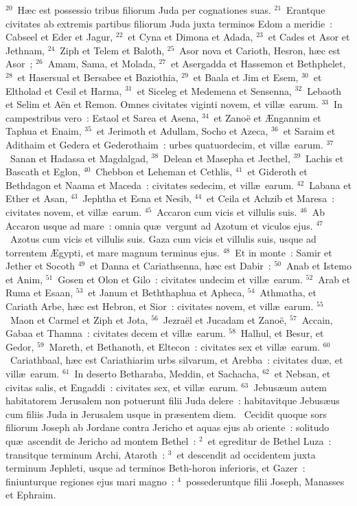 ${}^{20}$~H\ae c est possessio tribus filiorum Juda per cognationes suas.
${}^{21}$~Erantque civitates ab extremis partibus filiorum Juda juxta terminos Edom a meridie~: Cabseel et Eder et Jagur,
${}^{22}$~et Cyna et Dimona et Adada,
${}^{23}$~et Cades et Asor et Jethnam,
${}^{24}$~Ziph et Telem et Baloth,
${}^{25}$~Asor nova et Carioth, Hesron, h\ae c est Asor~;
${}^{26}$~Amam, Sama, et Molada,
${}^{27}$~et Asergadda et Hassemon et Bethphelet,
${}^{28}$~et Hasersual et Bersabee et Baziothia,
${}^{29}$~et Baala et Jim et Esem,
${}^{30}$~et Eltholad et Cesil et Harma,
${}^{31}$~et Siceleg et Medemena et Sensenna,
${}^{32}$~Lebaoth et Selim et A\"en et Remon. Omnes civitates viginti novem, et vill\ae\ earum.
${}^{33}$~In campestribus vero~: Estaol et Sarea et Asena,
${}^{34}$~et Zano\"e et \AE ngannim et Taphua et Enaim,
${}^{35}$~et Jerimoth et Adullam, Socho et Azeca,
${}^{36}$~et Saraim et Adithaim et Gedera et Gederothaim~: urbes quatuordecim, et vill\ae\ earum.
${}^{37}$~Sanan et Hadassa et Magdalgad,
${}^{38}$~Delean et Masepha et Jecthel,
${}^{39}$~Lachis et Bascath et Eglon,
${}^{40}$~Chebbon et Leheman et Cethlis,
${}^{41}$~et Gideroth et Bethdagon et Naama et Maceda~: civitates sedecim, et vill\ae\ earum.
${}^{42}$~Labana et Ether et Asan,
${}^{43}$~Jephtha et Esna et Nesib,
${}^{44}$~et Ceila et Achzib et Maresa~: civitates novem, et vill\ae\ earum.
${}^{45}$~Accaron cum vicis et villulis suis.
${}^{46}$~Ab Accaron usque ad mare~: omnia qu\ae\ vergunt ad Azotum et viculos ejus.
${}^{47}$~Azotus cum vicis et villulis suis. Gaza cum vicis et villulis suis, usque ad torrentem \AE gypti, et mare magnum terminus ejus.
${}^{48}$~Et in monte~: Samir et Jether et Socoth
${}^{49}$~et Danna et Cariathsenna, h\ae c est Dabir~:
${}^{50}$~Anab et Istemo et Anim,
${}^{51}$~Gosen et Olon et Gilo~: civitates undecim et vill\ae\ earum.
${}^{52}$~Arab et Ruma et Esaan,
${}^{53}$~et Janum et Beththaphua et Apheca,
${}^{54}$~Athmatha, et Cariath Arbe, h\ae c est Hebron, et Sior~: civitates novem, et vill\ae\ earum.
${}^{55}$~Maon et Carmel et Ziph et Jota,
${}^{56}$~Jezra\"el et Jucadam et Zano\"e,
${}^{57}$~Accain, Gabaa et Thamna~: civitates decem et vill\ae\ earum.
${}^{58}$~Halhul, et Besur, et Gedor,
${}^{59}$~Mareth, et Bethanoth, et Eltecon~: civitates sex et vill\ae\ earum.
${}^{60}$~Cariathbaal, h\ae c est Cariathiarim urbs silvarum, et Arebba~: civitates du\ae , et vill\ae\ earum.
${}^{61}$~In deserto Betharaba, Meddin, et Sachacha,
${}^{62}$~et Nebsan, et civitas salis, et Engaddi~: civitates sex, et vill\ae\ earum.
${}^{63}$~Jebus\ae um autem habitatorem Jerusalem non potuerunt filii Juda delere~: habitavitque Jebus\ae us cum filiis Juda in Jerusalem usque in pr\ae sentem diem.
~\lettrine[lines=10,image=true,loversize=0.05,lraise=-0.03]{C}{}ecidit quoque sors filiorum Joseph ab Jordane contra Jericho et aquas ejus ab oriente~: solitudo qu\ae\ ascendit de Jericho ad montem Bethel~:
${}^{2}$~et egreditur de Bethel Luza~: transitque terminum Archi, Ataroth~:
${}^{3}$~et descendit ad occidentem juxta terminum Jephleti, usque ad terminos Beth-horon inferioris, et Gazer~: finiunturque regiones ejus mari magno~:
${}^{4}$~possederuntque filii Joseph, Manasses et Ephraim.


